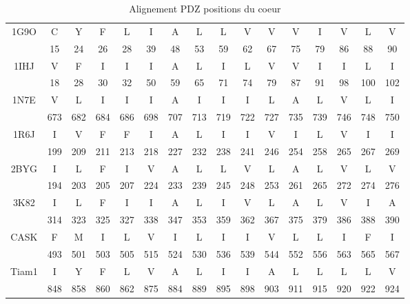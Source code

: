     \begin{table}[!htbp]
      \centering

     \caption{Alignement PDZ positions du coeur}   

      \begin{tabular}{cccccccccccccccc}

        \toprule

        \cmidrule{1-16}
   
          
1G9O & C & Y & F & L & I & A & L & L & V & V & V & I & V & L & V \\
     & 15 & 24 & 26 & 28 & 39 & 48 & 53 & 59 & 62 & 67 & 75 & 79 & 86 & 88 & 90 \\ 
1IHJ & V & F & I & I & I & A & L & I & L & V & V & I & I & L & I \\ 
     & 18 & 28 & 30 & 32 & 50 & 59 & 65 & 71 & 74 & 79 & 87 & 91 & 98 & 100 & 102 \\ 
1N7E & V & L & I & I & I & A & I & I & I & L & A & L & V & L & I \\
     & 673 & 682 & 684 & 686 & 698 & 707 & 713 & 719 & 722 & 727 & 735 & 739 & 746 & 748 & 750 \\ 
1R6J & I & V & F & F & I & A & L & I & I & V & I & L & V & I & I \\ 
     & 199 & 209 & 211 & 213 & 218 & 227 & 232 & 238 & 241 & 246 & 254 & 258 & 265 & 267 & 269 \\ 
2BYG & I & L & F & I & V & A & L & L & V & L & A & L & V & L & V \\ 
     & 194 & 203 & 205 & 207 & 224 & 233 & 239 & 245 & 248 & 253 & 261 & 265 & 272 & 274 & 276 \\ 
3K82 & I & L & F & I & I & A & L & I & V & L & A & L & V & I & A \\ 
     & 314 & 323 & 325 & 327 & 338 & 347 & 353 & 359 & 362 & 367 & 375 & 379 & 386 & 388 & 390 \\ 
CASK & F & M & I & L & V & I & L & I & I & V & L & L & I & F & I \\ 
     & 493 & 501 & 503 & 505 & 515 & 524 & 530 & 536 & 539 & 544 & 552 & 556 & 563 & 565 & 567 \\ 
Tiam1 & I & Y & F & L & V & A & L & I & I & A & L & L & L & L & V \\ 
      & 848 & 858 & 860 & 862 & 875 & 884 & 889 & 895 & 898 & 903 & 911 & 915 & 920 & 922 & 924 \\
          
   \bottomrule



   \end{tabular}     
\label{tab:corePDZ}      
    \end{table}



